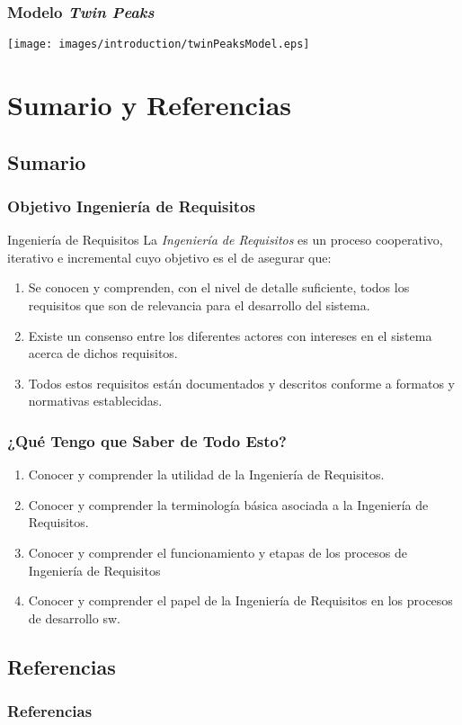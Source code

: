 \documentclass[handout,a4paper,slidestop,xcolor=pst,dvips,blue]{beamer}
\begin{document}
\begin{frame}
    \frametitle{Modelo \emph{Twin Peaks}}
    \begin{center}
		\texttt{[image: images/introduction/twinPeaksModel.eps]}
    \end{center}
\end{frame}

\section{Sumario y Referencias}

\subsection{Sumario}

\begin{frame}
    \frametitle{Objetivo Ingeniería de Requisitos}
    \begin{block}{Ingeniería de Requisitos}
        La \alert{\emph{Ingeniería de Requisitos}} es un proceso cooperativo, iterativo e incremental cuyo objetivo es el de asegurar que:
        \begin{enumerate}
            \item<2-> Se conocen y comprenden, con el nivel de detalle suficiente, todos los requisitos que son de relevancia para el desarrollo del sistema.
            \item<3-> Existe un consenso entre los diferentes actores con intereses en el sistema acerca de dichos requisitos.
            \item<4-> Todos estos requisitos están documentados y descritos conforme a formatos y normativas establecidas.
        \end{enumerate}
    \end{block}
\end{frame}

\begin{frame}
    \frametitle{¿Qué Tengo que Saber de Todo Esto?}
    \begin{enumerate}[<+->]
        \item Conocer y comprender la utilidad de la Ingeniería de Requisitos.
        \item Conocer y comprender la terminología básica asociada a la Ingeniería de Requisitos.
        \item Conocer y comprender el funcionamiento y etapas de los procesos de Ingeniería de Requisitos
        \item Conocer y comprender el papel de la Ingeniería de Requisitos en los procesos de desarrollo sw.
    \end{enumerate}
\end{frame}

\subsection{Referencias}

\begin{frame}[allowframebreaks]
	\frametitle{Referencias}
	
	
\end{frame}
\end{document}
